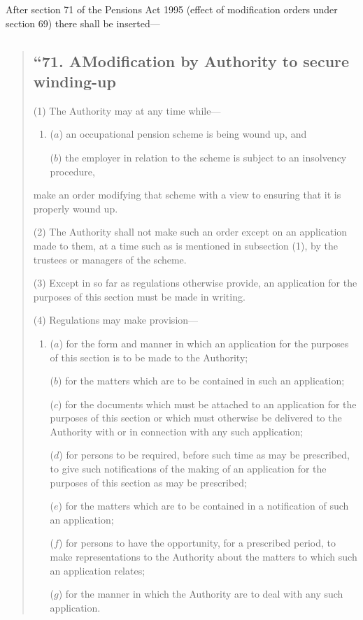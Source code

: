 \documentclass[12pt,a4paper]{article}
\begin{document}
After section 71 of the Pensions Act 1995 (effect of modification orders under section 69) there shall be inserted—
\begin{quotation}
\subsection*{“71. AModification by Authority to secure winding-up}

(1) The Authority may at any time while—
\begin{enumerate}\item[]
($a$) an occupational pension scheme is being wound up, and

($b$) the employer in relation to the scheme is subject to an insolvency procedure,
\end{enumerate}
make an order modifying that scheme with a view to ensuring that it is properly wound up.

(2) The Authority shall not make such an order except on an application made to them, at a time such as is mentioned in subsection (1), by the trustees or managers of the scheme.

(3) Except in so far as regulations otherwise provide, an application for the purposes of this section must be made in writing.

(4) Regulations may make provision—
\begin{enumerate}\item[]
($a$) for the form and manner in which an application for the purposes of this section is to be made to the Authority;

($b$) for the matters which are to be contained in such an application;

($c$) for the documents which must be attached to an application for the purposes of this section or which must otherwise be delivered to the Authority with or in connection with any such application;

($d$) for persons to be required, before such time as may be prescribed, to give such notifications of the making of an application for the purposes of this section as may be prescribed;

($e$) for the matters which are to be contained in a notification of such an application;

($f$) for persons to have the opportunity, for a prescribed period, to make representations to the Authority about the matters to which such an application relates;

($g$) for the manner in which the Authority are to deal with any such application.
\end{enumerate}


\end{quotation}
\end{document}
